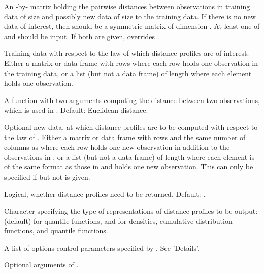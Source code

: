 \documentclass[a4paper]{book}
\begin{document}
\begin{Arguments}
\begin{ldescription}
\item[\code{distmat}] An -by- matrix holding the pairwise distances between observations 
in training data of size  and possibly new data of size  to the training data.
If there is no new data of interest, then  should be a symmetric matrix of dimension . 
At least one of  and  should be input. 
If both are given,  overrides .

\item[\code{data}] Training data with respect to the law of which distance profiles are of interest. 
Either a matrix or data frame with  rows where each row holds one observation 
in the training data, or a list (but not a data frame) of length  where each element holds one observation.

\item[\code{distfun}] A function with two arguments computing the distance between two observations, 
which is used in . Default: Euclidean distance.

\item[\code{newdata}] Optional new data, at which distance profiles are to be computed 
with respect to the law of . 
Either a matrix or data frame with  rows and the same number of columns as  
where each row holds one new observation in addition to the observations in . 
or a list (but not a data frame) of length  where each element is of the same format as those in  
and holds one new observation. 
This can only be specified if  but not  is given.

\item[\code{output\_profile}] Logical, whether distance profiles need to be returned. Default: .

\item[\code{type}] Character specifying the type of representations of distance profiles to be output:
 (default) for quantile functions,
and  for densities, cumulative distribution functions, and quantile functions.

\item[\code{optns}] A list of options control parameters specified by . See 'Details'.

\item[\code{...}] Optional arguments of .
\end{ldescription}
\end{Arguments}
\end{document}
